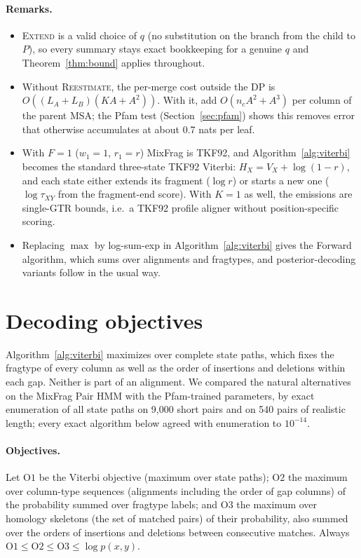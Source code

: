 \documentclass[11pt]{article}
\begin{document}
\paragraph{Remarks.}
\begin{itemize}
\item \textsc{Extend} is a valid choice of $q$ (no substitution on the branch
  from the child to $P$), so every summary stays exact bookkeeping for a
  genuine $q$ and Theorem~\ref{thm:bound} applies throughout.
\item Without \textsc{Reestimate}, the per-merge cost outside the DP is
  $O((L_A+L_B)(KA+A^2))$. With it, add $O(n_cA^2+A^3)$ per column of the parent
  MSA; the Pfam test (Section~\ref{sec:pfam}) shows this removes error that
  otherwise accumulates at about 0.7 nats per leaf.
\item With $F=1$ ($w_1=1$, $r_1=r$) MixFrag is TKF92, and
  Algorithm~\ref{alg:viterbi} becomes the standard three-state TKF92 Viterbi:
  $H_X=V_X+\log(1-r)$, and each state either extends its fragment
  ($\log r$) or starts a new one ($\log\tau_{XY}$ from the fragment-end score).
  With $K=1$ as well, the emissions are single-GTR bounds, i.e.\ a TKF92
  profile aligner without position-specific scoring.
\item Replacing $\max$ by log-sum-exp in Algorithm~\ref{alg:viterbi} gives the
  Forward algorithm, which sums over alignments and fragtypes, and
  posterior-decoding variants follow in the usual way.
\end{itemize}

\section{Decoding objectives}
\label{sec:decoding}

Algorithm~\ref{alg:viterbi} maximizes over complete state paths, which fixes
the fragtype of every column as well as the order of insertions and deletions
within each gap. Neither is part of an alignment. We compared the natural
alternatives on the MixFrag Pair HMM with the Pfam-trained parameters, by exact
enumeration of all state paths on 9{,}000 short pairs and on 540 pairs of
realistic length; every exact algorithm below agreed with enumeration to
$10^{-14}$.

\paragraph{Objectives.} Let $\mathrm{O1}$ be the Viterbi objective (maximum over
state paths); $\mathrm{O2}$ the maximum over column-type sequences (alignments
including the order of gap columns) of the probability summed over fragtype
labels; and $\mathrm{O3}$ the maximum over homology skeletons (the set of matched
pairs) of their probability, also summed over the orders of insertions and
deletions between consecutive matches. Always
$\mathrm{O1}\le\mathrm{O2}\le\mathrm{O3}\le\log p(x,y)$.
\end{document}
